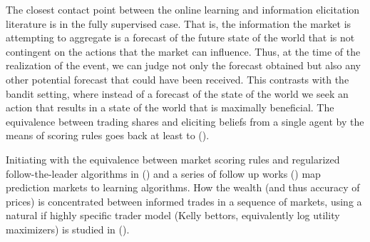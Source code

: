 The closest contact point between the online learning and information elicitation literature is in the fully supervised case.
That is, the information the market is attempting to aggregate is a forecast of the future state of the world that is not contingent on the actions that the market can influence. Thus, at the time of the realization of the event, we can judge not only the forecast obtained but also any other potential forecast that could have been received. 
This contrasts with the bandit setting, where instead of a forecast of the state of the world we seek an action that results in a state of the world that is maximally beneficial.
The equivalence between trading shares and eliciting beliefs from a single agent by the means of scoring rules goes back at least to (\cite{savage1971elicitation}). 





Initiating with the equivalence between market scoring rules and regularized follow-the-leader algorithms in (\cite{chen2010new}) and a series of follow up works (\cite{abernethy2013efficient, frongillo2012interpreting, hu2014multi, frongillo2015convergence}) map prediction markets to learning algorithms. 
How the wealth (and thus accuracy of prices) is concentrated between informed trades in a sequence of markets, using a natural if highly specific trader model (Kelly bettors, equivalently log utility maximizers) is studied in (\cite{beygelzimer2012learning}).


